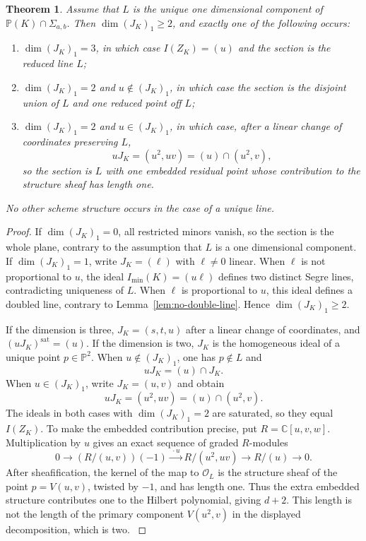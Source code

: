 \documentclass[11pt]{amsart}
\newcommand{\chg}[1]{#1}
\newcommand{\sat}{\mathrm{sat}}
\theoremstyle{plain}
\newtheorem{theorem}{Theorem}[section]
\theoremstyle{definition}
\theoremstyle{remark}
\begin{document}
\begin{theorem}\label{thm:residual-linear-ideal}
Assume that $L$ is the unique \chg{one dimensional} component of $\mathbb P(K)\cap\Sigma_{a,b}$. Then $\dim(J_K)_1\ge2$, and exactly one of the following occurs:
\begin{enumerate}
\item $\dim(J_K)_1=3$, in which case {$I(Z_K)=(u)$ and the section is the reduced line $L$};
\item $\dim(J_K)_1=2$ and $u\notin(J_K)_1$, in which case the section is the disjoint union of $L$ and one reduced point off $L$;
\item $\dim(J_K)_1=2$ and $u\in(J_K)_1$, in which case, after a linear change of coordinates preserving $L$,
\[
uJ_K=(u^2,uv)=(u)\cap(u^2,v),
\]
so the section is $L$ with {one embedded residual point whose contribution to the structure sheaf has length one}.
\end{enumerate}
No other scheme structure occurs in the \chg{case of a unique line}.
\end{theorem}

\begin{proof}
{If $\dim(J_K)_1=0$, all restricted minors vanish, so the section is the whole plane, contrary to the assumption that $L$ is a one dimensional component. If $\dim(J_K)_1=1$, write $J_K=(\ell)$ with $\ell\ne0$ linear. When $\ell$ is not proportional to $u$, the ideal $I_{\min}(K)=(u\ell)$ defines two distinct Segre lines, contradicting uniqueness of $L$. When $\ell$ is proportional to $u$, this ideal defines a doubled line, contrary to Lemma~\ref{lem:no-double-line}. Hence $\dim(J_K)_1\ge2$.}

If the dimension is three, $J_K=(s,t,u)$ after a linear change of coordinates, and $(uJ_K)^\sat=(u)$. If the dimension is two, $J_K$ is the homogeneous ideal of a unique point $p\in\mathbb P^2$. When $u\notin(J_K)_1$, one has $p\notin L$ and
\[
uJ_K=(u)\cap J_K.
\]
When $u\in(J_K)_1$, write $J_K=(u,v)$ and obtain
\[
uJ_K=(u^2,uv)=(u)\cap(u^2,v).
\]
{
The ideals in both cases with $\dim(J_K)_1=2$ are saturated, so they equal $I(Z_K)$. To make the embedded contribution precise, put $R=\mathbb C[u,v,w]$. Multiplication by $u$ gives an exact sequence of graded $R$-modules
\[
0\longrightarrow (R/(u,v))(-1)
\xrightarrow{\ \cdot u\ } R/(u^2,uv)
\longrightarrow R/(u)\longrightarrow0.
\]
After sheafification, the kernel of the map to $\mathcal O_L$ is the structure sheaf of the point $p=V(u,v)$, twisted by $-1$, and has length one. Thus the extra embedded structure contributes one to the Hilbert polynomial, giving $d+2$. This length is not the length of the primary component $V(u^2,v)$ in the displayed decomposition, which is two.
}
\end{proof}
\end{document}
